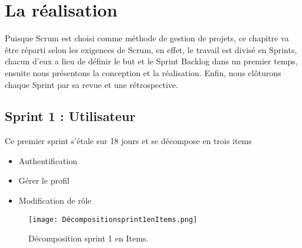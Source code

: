 \chapter{La réalisation}
\label{sec:conception}

\begin{fquote}Puisque Scrum est choisi comme méthode de gestion de projets, ce chapitre va être réparti selon
	les exigences de Scrum, en effet, le travail est divisé en Sprints, chacun d’eux a lieu de définir le but
	et le Sprint Backlog dans un premier temps, ensuite nous présentons la conception et la réalisation.
	Enfin, nous clôturons chaque Sprint par sa revue et une rétrospective.
 \end{fquote}

\clearpage

\section{Sprint 1 : Utilisateur }
\label{sec:conception}

\begin{fquote}
Ce premier sprint s’étale sur 18 jours et se décompose en trois items  \end{fquote}
\smallskip
\begin{itemize}[label=$\diamond$]
	\item Authentification
	\item Gérer le profil
	\item Modification de rôle
\end{itemize}
\medskip
\medskip
\medskip
\medskip
\medskip
\medskip
\medskip
\medskip
\medskip
\medskip
\begin{figure}[ht]
	\centering
	\texttt{[image: Décompositionsprint1enItems.png]}
	\caption{Décomposition sprint 1 en Items.}
	\label{fig:Décomposition sprint 1 en Items}
\end{figure}
\FloatBarrier
\clearpage

